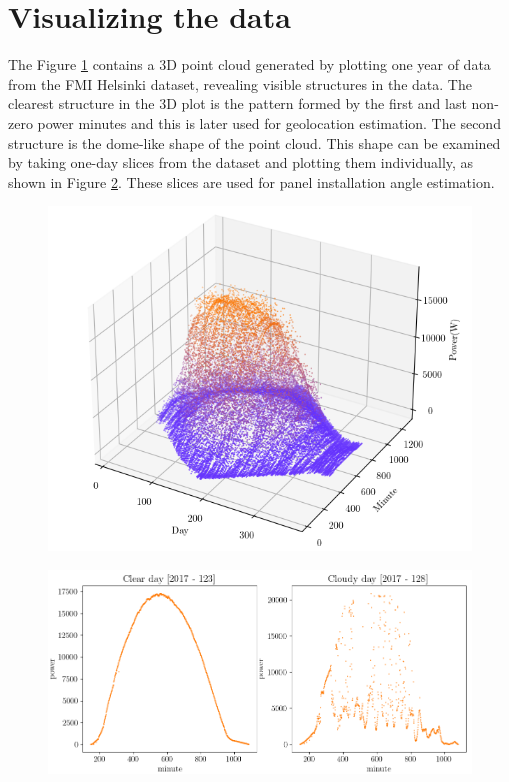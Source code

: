 \section{Visualizing the data}
The Figure \ref{fig_oneyear_pointcloud} contains a 3D point cloud generated by plotting one year of data from the FMI Helsinki dataset, revealing visible structures in the data. The clearest structure in the 3D plot is the pattern formed by the first and last non-zero power minutes and this is later used for geolocation estimation. The second structure is the dome-like shape of the point cloud. This shape can be examined by taking one-day slices from the dataset and plotting them individually, as shown in Figure  \ref{fig_cloudfree_vs_cloudy}. These slices are used for panel installation angle estimation.

\begin{figure}[h]
\centering
\includegraphics[width=0.8\linewidth]{pics/oneyear2}
\label{fig_oneyear_pointcloud}
\end{figure}

\newpage
\begin{figure}[h!]
\centering
\includegraphics[width=1\linewidth]{pics/cloudfree_vs_cloudy}
\label{fig_cloudfree_vs_cloudy}
\end{figure}

